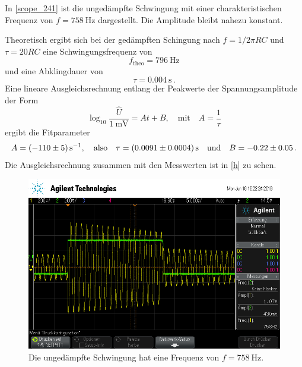 In \autoref{scope_241} ist die ungedämpfte Schwingung mit einer charakteristischen Frequenz von $f = \SI{758}{\hertz}$ dargestellt. Die Amplitude bleibt nahezu konstant.\par
Theoretisch ergibt sich bei der gedämpften Schingung nach $f = 1 / 2\pi RC$ und $\tau = 20RC$ eine Schwingungsfrequenz von
\begin{equation*}
	f_\text{theo} = \SI{796}{\hertz}
\end{equation*}
und eine Abklingdauer von
\begin{equation*}
	\tau = \SI{0.004}{\second}\,.
\end{equation*}
Eine lineare Ausgleichsrechnung entlang der Peakwerte der Spannungsamplitude der Form
\begin{equation}
	\log_{10} \frac{\hat{U}}{\SI{1}{\milli\volt}} = At + B, \quad \text{mit} \quad A = \frac{1}{\tau}
\end{equation}
ergibt die Fitparameter
\begin{equation*}
	A = \SI[separate-uncertainty = true]{-110 (5)}{\per\second}, \quad \text{also} \quad \tau = \SI[separate-uncertainty = true]{0.0091 (4)}{\second} \quad \text{und} \quad B = -0.22 \pm 0.05\,.
\end{equation*}
Die Ausgleichsrechnung zusammen mit den Messwerten ist in \autoref{h} zu sehen.
\begin{figure}[h]
	\centering
	\includegraphics[width=\textwidth]{usb/scope_241.png}
	\caption{Die ungedämpfte Schwingung hat eine Frequenz von $f = \SI{758}{\hertz}$.}
	\label{scope_241}
\end{figure}

